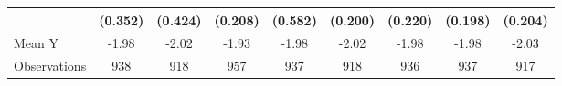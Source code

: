 {\begin{tabular}{l*{8}{c}}
            &     (0.352)         &     (0.424)         &     (0.208)         &     (0.582)         &     (0.200)         &     (0.220)         &     (0.198)         &     (0.204)         \\
\midrule
Mean Y      &       -1.98         &       -2.02         &       -1.93         &       -1.98         &       -2.02         &       -1.98         &       -1.98         &       -2.03         \\
Observations&         938         &         918         &         957         &         937         &         918         &         936         &         937         &         917         \\
\bottomrule
\end{tabular}
}
